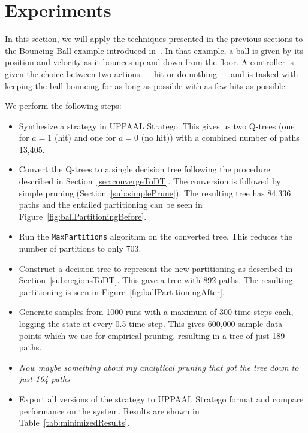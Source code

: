 \section{Experiments}%
\label{sec:experiments}

In this section, we will apply the techniques presented in the previous sections
to the Bouncing Ball example introduced in~\cite{Manfred2019}. In that example,
a ball is given by its position and velocity as it bounces up and down from the
floor. A controller is given the choice between two actions --- hit or do
nothing --- and is tasked with keeping the ball bouncing for as long as possible
with as few hits as possible.

We perform the following steps:

\begin{itemize}
    \item Synthesize a strategy in UPPAAL Stratego. This gives us two Q-trees
        (one for $a = 1$ (hit) and one for $a = 0$ (no hit)) with a combined
        number of paths 13,405.
    \item Convert the Q-trees to a single decision tree following the procedure
        described in Section~\ref{sec:convergeToDT}. The conversion is followed
        by simple pruning (Section~\ref{sub:simplePrune}). The resulting tree
        has 84,336 paths and the entailed partitioning can be seen in
        Figure~\ref{fig:ballPartitioningBefore}.
    \item Run the \texttt{MaxPartitions} algorithm on the converted tree. This
        reduces the number of partitions to only 703.
    \item Construct a decision tree to represent the new partitioning as
        described in Section~\ref{sub:regionsToDT}. This gave a tree with 892
        paths. The resulting partitioning is seen in
        Figure~\ref{fig:ballPartitioningAfter}.
    \item Generate samples from 1000 runs with a maximum of 300 time steps each,
        logging the state at every 0.5 time step. This gives 600,000 sample data
        points which we use for empirical pruning, resulting in a tree of just
        189 paths.
    \item \textit{Now maybe something about my analytical pruning that got the
        tree down to just 164 paths}
    \item Export all versions of the strategy to UPPAAL Stratego format and
        compare performance on the system. Results are shown in
        Table~\ref{tab:minimizedResults}.
\end{itemize}

